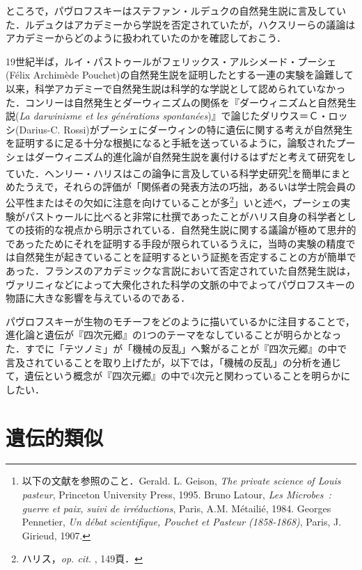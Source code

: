 ところで，パヴロフスキーはステファン・ルデュクの自然発生説に言及していた．ルデュクはアカデミーから学説を否定されていたが，ハクスリーらの議論はアカデミーからどのように扱われていたのかを確認しておこう．

19世紀半ば，ルイ・パストゥールがフェリックス・アルシメード・プーシェ(Félix Archimède Pouchet)の自然発生説を証明したとする一連の実験を論難して以来，科学アカデミーで自然発生説は科学的な学説として認められていなかった．コンリーは自然発生とダーウィニズムの関係を『ダーウィニズムと自然発生説(\emph{La darwinisme et les générations spontanées})』で論じたダリウス＝Ｃ・ロッシ(Darius-C. Rossi)がプーシェにダーウィンの特に遺伝に関する考えが自然発生を証明するに足る十分な根拠になると手紙を送っているように，論駁されたプーシェはダーウィニズム的進化論が自然発生説を裏付けるはずだと考えて研究をしていた．ヘンリー・ハリスはこの論争に言及している科学史研究\footnote{以下の文献を参照のこと．Gerald. L. Geison, \emph{The private science of Louis pasteur}, Princeton University Press, 1995. Bruno Latour, \emph{Les Microbes~: guerre et paix, suivi de irréductions}, Paris, A.M. Métailié, 1984. Georges Pennetier, \emph{Un débat scientifique, Pouchet et Pasteur (1858-1868)}, Paris, J. Girieud, 1907.}を簡単にまとめたうえで，それらの評価が「関係者の発表方法の巧拙，あるいは学士院会員の公平性またはその欠如に注意を向けていることが多\footnote{ハリス，\emph{op. cit. }, 149頁．}」いと述べ，プーシェの実験がパストゥールに比べると非常に杜撰であったことがハリス自身の科学者としての技術的な視点から明示されている．自然発生説に関する議論が極めて思弁的であったためにそれを証明する手段が限られているうえに，当時の実験の精度では自然発生が起きていることを証明するという証拠を否定することの方が簡単であった．フランスのアカデミックな言説において否定されていた自然発生説は，ヴァリニィなどによって大衆化された科学の文脈の中でよってパヴロフスキーの物語に大きな影響を与えているのである．

パヴロフスキーが生物のモチーフをどのように描いているかに注目することで，進化論と遺伝が『四次元郷』の1つのテーマをなしていることが明らかとなった．すでに「テツノミ」が「機械の反乱」へ繋がることが『四次元郷』の中で言及されていることを取り上げたが，以下では，「機械の反乱」の分析を通じて，遺伝という概念が『四次元郷』の中で4次元と関わっていることを明らかにしたい．

\section{遺伝的類似}

